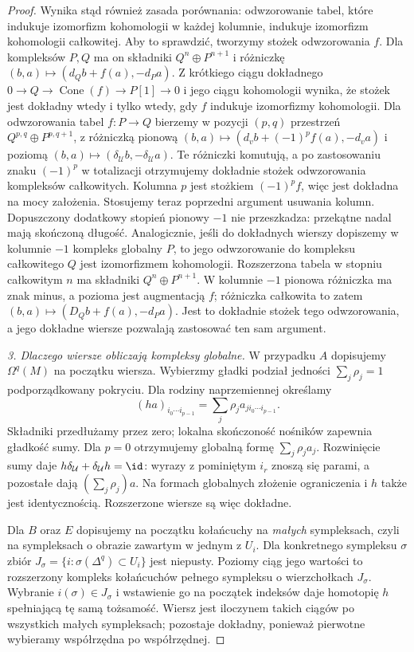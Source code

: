 \begin{proof}
Wynika stąd również zasada porównania: odwzorowanie
tabel, które indukuje izomorfizm kohomologii w każdej
kolumnie, indukuje izomorfizm kohomologii całkowitej.
Aby to sprawdzić, tworzymy stożek odwzorowania $f$.
Dla kompleksów $P,Q$ ma on składniki
$Q^n\oplus P^{n+1}$ i różniczkę
$(b,a)\mapsto(d_Qb+f(a),-d_Pa)$.
Z krótkiego ciągu dokładnego
$0\to Q\to\operatorname{Cone}(f)\to P[1]\to0$
i jego ciągu kohomologii wynika, że stożek jest dokładny
wtedy i tylko wtedy, gdy $f$ indukuje izomorfizmy
kohomologii. Dla odwzorowania tabel $f:P\to Q$ bierzemy
w pozycji $(p,q)$ przestrzeń $Q^{p,q}\oplus P^{p,q+1}$,
z różniczką pionową
$(b,a)\mapsto(d_vb+(-1)^p f(a),-d_va)$
i poziomą $(b,a)\mapsto(\delta_{\mathcal U}b,-\delta_{\mathcal U}a)$.
Te różniczki komutują, a po zastosowaniu znaku $(-1)^p$
w totalizacji otrzymujemy dokładnie stożek odwzorowania
kompleksów całkowitych. Kolumna $p$ jest stożkiem
$(-1)^p f$, więc jest dokładna na mocy założenia.
Stosujemy teraz poprzedni argument usuwania kolumn.
Dopuszczony dodatkowy stopień pionowy $-1$ nie przeszkadza:
przekątne nadal mają skończoną długość. Analogicznie,
jeśli do dokładnych wierszy dopiszemy w kolumnie $-1$
kompleks globalny $P$, to jego odwzorowanie do kompleksu
całkowitego $Q$ jest izomorfizmem kohomologii.
Rozszerzona tabela w stopniu całkowitym $n$ ma składniki
$Q^n\oplus P^{n+1}$. W kolumnie $-1$ pionowa różniczka
ma znak minus, a pozioma jest augmentacją $f$;
różniczka całkowita to zatem
$(b,a)\mapsto(D_Qb+f(a),-d_Pa)$.
Jest to dokładnie stożek tego odwzorowania, a jego
dokładne wiersze pozwalają zastosować ten sam argument.

\emph{3. Dlaczego wiersze obliczają kompleksy globalne.}
W przypadku $A$ dopisujemy $\Omega^q(M)$ na początku
wiersza. Wybierzmy gładki podział jedności
$\sum_j\rho_j=1$ podporządkowany pokryciu. Dla rodziny
naprzemiennej określamy
\[
 (ha)_{i_0\cdots i_{p-1}}
   =\sum_j\rho_j a_{j i_0\cdots i_{p-1}}.
\]
Składniki przedłużamy przez zero; lokalna skończoność
nośników zapewnia gładkość sumy. Dla $p=0$ otrzymujemy
globalną formę $\sum_j\rho_j a_j$.
Rozwinięcie sumy daje
$h\delta_{\mathcal U}+\delta_{\mathcal U}h=\id$:
wyrazy z pominiętym $i_r$ znoszą się parami, a pozostałe
dają $(\sum_j\rho_j)a$. Na formach globalnych złożenie
ograniczenia i $h$ także jest identycznością.
Rozszerzone wiersze są więc dokładne.

Dla $B$ oraz $E$ dopisujemy na początku kołańcuchy
na \emph{małych} sympleksach, czyli na sympleksach
o obrazie zawartym w jednym z $U_i$. Dla konkretnego
sympleksu $\sigma$ zbiór
$J_\sigma=\{i:\sigma(\Delta^q)\subset U_i\}$ jest
niepusty. Poziomy ciąg jego wartości to rozszerzony
kompleks kołańcuchów pełnego sympleksu o wierzchołkach
$J_\sigma$. Wybranie $i(\sigma)\in J_\sigma$ i wstawienie
go na początek indeksów daje homotopię $h$ spełniającą
tę samą tożsamość. Wiersz jest iloczynem takich ciągów
po wszystkich małych sympleksach; pozostaje dokładny,
ponieważ pierwotne wybieramy współrzędna po współrzędnej.


\end{proof}
